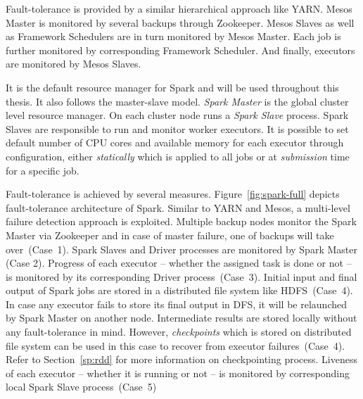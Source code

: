 \begin{description}[leftmargin=0pt]
    Fault-tolerance is provided by a similar hierarchical approach like YARN. Mesos Master is monitored by several backups through Zookeeper. Mesos Slaves as well as Framework Schedulers are in turn monitored by Mesos Master. Each job is further monitored by corresponding Framework Scheduler. And finally, executors are monitored by Mesos Slaves. 
    \item [Spark Standalone] It is the default resource manager for Spark and will be used throughout this thesis. It also follows the master-slave model. \emph{Spark Master} is the global cluster level resource manager. On each cluster node runs a \emph{Spark Slave} process. Spark Slaves are responsible to run and monitor worker executors. It is possible to set default number of CPU cores and available memory for each executor through configuration, either \emph{statically} which is applied to all jobs or at \emph{submission} time for a specific job.
    
     Fault-tolerance is achieved by several measures. Figure~\ref{fig:spark-full} depicts fault-tolerance architecture of Spark. Similar to YARN and Mesos, a multi-level failure detection approach is exploited. Multiple backup nodes monitor the Spark Master via Zookeeper and in case of master failure, one of backups will take over~(Case~1). Spark Slaves and Driver processes are monitored by Spark Master (Case 2). Progress of each executor -- whether the assigned task is done or not -- is monitored by its corresponding Driver process~(Case~3). Initial input and final output of Spark jobs are stored in a distributed file system like HDFS~(Case~4). In case any executor fails to store its final output in DFS, it will be relaunched by Spark Master on another node. Intermediate results are stored locally without any fault-tolerance in mind. However, \emph{checkpoints} which is stored on distributed file system can be used in this case to recover from executor failures~(Case~4). Refer to Section~\ref{sp:rdd} for more information on checkpointing process. Liveness of each executor -- whether it is running or not -- is monitored by corresponding local Spark Slave process~(Case~5)
\end{description}
